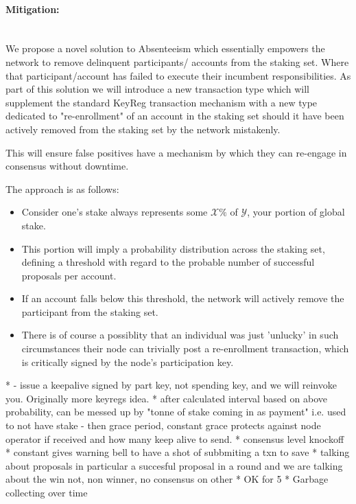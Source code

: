 \documentclass[11pt,a4paper]{article}
\begin{document}
\paragraph{Mitigation:} \mbox{}\\
We propose a novel solution to Absenteeism which essentially empowers the network to remove delinquent participants/
accounts from the staking set. Where that participant/account has failed to execute their incumbent responsibilities.
As part of this solution we will introduce a new transaction type which will supplement the standard \gls{KeyReg} 
transaction mechanism with a new type dedicated to "re-enrollment" of an account in the staking set should it have been 
actively removed from the staking set by the network mistakenly.

This will ensure false positives have a mechanism by which they can re-engage in consensus without downtime.

The approach is as follows:

\begin{itemize}
    \item Consider one's stake always represents some $\mathcal{X}\%$ of $\mathcal{Y}$, your portion of global stake.
    \item This portion will imply a probability distribution across the staking set, defining a threshold with regard to 
          the probable number of successful proposals per account.
    \item If an account falls below this threshold, the network will actively remove the participant from the staking
          set.
    \item There is of course a possiblity that an individual was just 'unlucky' in such circumstances their node can 
          trivially post a re-enrollment transaction, which is critically signed by the node's participation key.
\end{itemize}


*  - issue a keepalive signed by part key, not spending key, and we will reinvoke you. Originally more keyregs idea.
* after calculated interval based on above probability, can be messed up by "tonne of stake coming in as payment" i.e. used to not have stake - then grace period, constant grace protects against node operator if received and how many keep alive to send.
* consensus level knockoff 
* constant gives warning bell to have a shot of subbmiting a txn to save 
* talking about proposals in particular a succesful proposal in a round and we are talking about the win not, non winner, no consensus on other
* OK for 5%
* Garbage collecting over time
\end{document}
